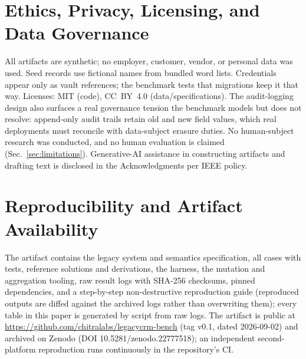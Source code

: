 \documentclass[journal]{IEEEtran}
\begin{document}
\section{Ethics, Privacy, Licensing, and Data Governance}
\label{sec:ethics}
All artifacts are synthetic; no employer, customer, vendor, or personal data was used. Seed
records use fictional names from bundled word lists. Credentials appear only as vault
references; the benchmark tests that migrations keep it that way. Licenses: MIT (code),
CC~BY~4.0 (data/specifications). The audit-logging design also surfaces a real governance
tension the benchmark models but does not resolve: append-only audit trails retain old and
new field values, which real deployments must reconcile with data-subject erasure duties.
No human-subject research was conducted, and no human evaluation is claimed
(Sec.~\ref{sec:limitations}). Generative-AI assistance in constructing artifacts and drafting
text is disclosed in the Acknowledgments per IEEE policy.

\section{Reproducibility and Artifact Availability}
\label{sec:repro}
The artifact contains the legacy system and semantics specification, all cases with tests,
reference solutions and derivations, the harness, the mutation and aggregation tooling, raw
result logs with SHA-256 checksums, pinned dependencies, and a step-by-step non-destructive
reproduction guide (reproduced outputs are diffed against the archived logs rather than
overwriting them); every table in this paper is generated by script from raw logs.
The artifact is public at \url{https://github.com/chitralabs/legacycrm-bench} (tag v0.1, dated 2026-09-02) and archived on
Zenodo (DOI 10.5281/zenodo.22777518); an independent second-platform reproduction runs continuously in the
repository's CI.
\end{document}
